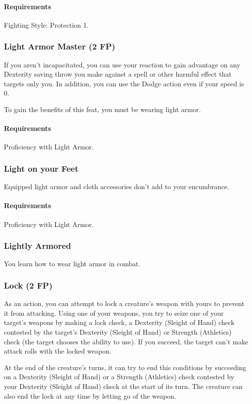     \paragraph{Requirements} Fighting Style: Protection 1.
\subsubsection{Light Armor Master (2 FP)} \label{feat::lightarmormaster}
    If you aren't incapacitated, you can use your reaction to gain advantage on any Dexterity saving throw you make against a spell or other harmful effect that targets only you.
    In addition, you can use the Dodge action even if your speed is 0.

    To gain the benefits of this feat, you must be wearing light armor.
    \paragraph{Requirements} Proficiency with Light Armor.
\subsubsection{Light on your Feet} \label{feat::lightonyourfeet}
    Equipped light armor and cloth accessories don't add to your encumbrance.
    \paragraph{Requirements} Proficiency with Light Armor.
\subsubsection{Lightly Armored} \label{feat::lightlyarmored}
    You learn how to wear light armor in combat.
\subsubsection{Lock (2 FP)} \label{feat::lock}
    As an action, you can attempt to lock a creature's weapon with yours to prevent it from attacking.
    Using one of your weapons, you try to seize one of your target's weapons by making a lock check, a Dexterity (Sleight of Hand) check contested by the target's Dexterity (Sleight of Hand) or Strength (Athletics) check (the target chooses the ability to use).
    If you succeed, the target can't make attack rolls with the locked weapon.

    At the end of the creature's turns, it can try to end this conditions by succeeding on a Dexterity (Sleight of Hand) or a Strength (Athletics) check contested by your Dexterity (Sleight of Hand) check at the start of its turn.
    The creature can also end the lock at any time by letting go of the weapon.

